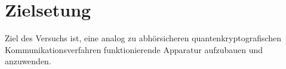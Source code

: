 \section{Zielsetung}

Ziel des Versuchs ist, eine analog zu abhörsicheren quantenkryptografischen Kommunikationsverfahren funktionierende
Apparatur aufzubauen und anzuwenden.
